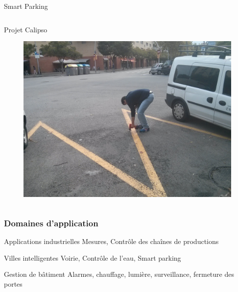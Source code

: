 \begin{frame}{Smart Parking}
\begin{columns}
\begin{column}{0.48\textwidth}
\begin{alertblock}{Projet Calipso}
\begin{itemize}
          \end{itemize}
        \end{alertblock}
        \begin{figure}
          \centering
          \includegraphics[width=.7\textwidth]{figures/installation_smart_parking.jpg}
        \end{figure}
      \end{column}
  \end{columns}
\end{frame}

\begin{frame}\frametitle{Domaines d'application}

    \begin{block}{Applications industrielles}
      Mesures, Contrôle des chaînes de productions
    \end{block}
  
    \begin{block}{Villes intelligentes}
      Voirie, Contrôle de l'eau, Smart parking
    \end{block}
  
    \begin{block}{Gestion de bâtiment}
      Alarmes, chauffage, lumière, surveillance, fermeture des portes
    \end{block}
  

  
\end{frame}

